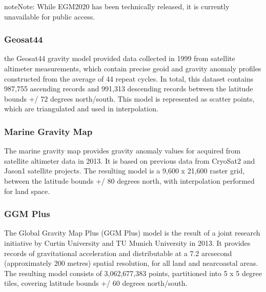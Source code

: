 \documentclass[letterpaper,10pt,english]{sphinxmanual}
\begin{document}
\begin{sphinxadmonition}{note}{Note:}
\sphinxAtStartPar
While EGM\sphinxhyphen{}2020 has been technically released, it is currently unavailable for public access.
\end{sphinxadmonition}


\subsubsection{Geosat\sphinxhyphen{}44}
\label{\detokenize{usage/gravity_modelling:geosat-44}}
\sphinxAtStartPar
the Geosat\sphinxhyphen{}44 gravity model provided data collected in 1999 from satellite altimeter measurements, which contain
precise geoid and gravity anomaly profiles constructed from the average of 44 repeat cycles. In total, this dataset
contains 987,755 ascending records and 991,313 descending records between the latitude bounds +/\sphinxhyphen{} 72 degrees
north/south. This model is represented as scatter points, which are triangulated and used in interpolation.


\subsubsection{Marine Gravity Map}
\label{\detokenize{usage/gravity_modelling:marine-gravity-map}}
\sphinxAtStartPar
The marine gravity map provides gravity anomaly values for acquired from satellite altimeter data in 2013. It is based
on previous data from CryoSat\sphinxhyphen{}2 and Jason\sphinxhyphen{}1 satellite projects. The resulting model is a 9,600 x 21,600 raster grid,
between the latitude bounds +/\sphinxhyphen{} 80 degrees north, with interpolation performed for land space.


\subsubsection{GGM Plus}
\label{\detokenize{usage/gravity_modelling:ggm-plus}}
\sphinxAtStartPar
The Global Gravity Map Plus (GGM Plus) model is the result of a joint research initiative by Curtin University and
TU Munich University in 2013. It provides records of gravitational acceleration and distributable at a 7.2 arc\sphinxhyphen{}second
(approximately 200 metres) spatial resolution, for all land and near\sphinxhyphen{}coastal areas. The resulting model consists of
3,062,677,383 points, partitioned into 5 x 5 degree tiles, covering latitude bounds +/\sphinxhyphen{} 60 degrees north/south.
\end{document}

